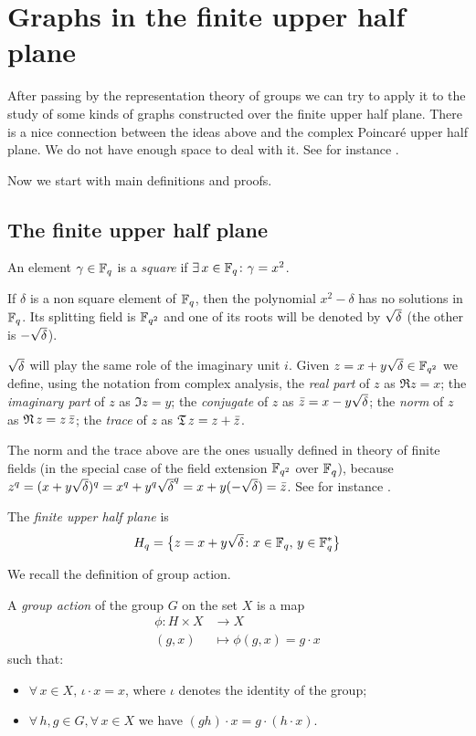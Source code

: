 \section{Graphs in the finite upper half plane}
After passing by the representation theory of groups we can try to apply it to the study of some kinds of graphs constructed
over the finite upper half plane. There is a nice connection between the ideas above and the complex Poincaré upper half plane. We
do not have enough space to deal with it. See for instance \cite{terras_1999}.

Now we start with main definitions and proofs.
\subsection{The finite upper half plane}
\begin{defn}
	An element $\gamma \in {\mathbb F}_q$ is a {\it square} if $\exists \, x \in {\mathbb F}_q \colon \gamma = x^2$.
\end{defn}
If $\delta$ is a non square element of ${\mathbb F}_q$, then the polynomial $x^2 - \delta$ has no solutions in ${\mathbb F}_q$.
Its splitting field is ${\mathbb F}_{q^2}$ and one of its roots will be denoted by $\sqrt{\delta}$ (the other is $-\sqrt{\delta}$). 

$\sqrt{\delta}$ will play the same role of the imaginary unit $i$. Given $z=x+y\sqrt{\delta} \in {\mathbb F}_{q^2}$ we define,
using the notation from complex analysis, the {\it real part} of $z$ as $\Re z = x$;
the {\it imaginary part} of $z$ as $\Im z = y$;
the {\it conjugate} of $z$ as $\bar{z} = x-y\sqrt{\delta}$; the {\it norm} of $z$ as $\operatorname{\mathfrak{N}} z = z \, \bar{z}$;
the {\it trace} of $z$ as $\operatorname{\mathfrak{T}} z = z+\bar{z}$.
\begin{rem}
The norm and the trace above are the ones usually defined in theory of finite fields (in the special case of the field 
extension ${\mathbb F}_{q^2}$ over ${\mathbb F}_q$), because $z^q= (x+y\sqrt{\delta})^q = x^q+y^q \sqrt{\delta}^q = x+y(-\sqrt{\delta}) =\bar{z}$.
See for instance \cite{lidl1994introduction}.
\end{rem}
\begin{defn}
	The {\it finite upper half plane} is
	\begin{equation}
		H_q = \big\{ z=x+y \sqrt{\delta} \colon x \in {\mathbb F}_q,\, y \in {\mathbb F}_q^* \big\} 
	\end{equation} 
\end{defn}

We recall the definition of group action.
\begin{defn}
  A {\it group action} of the group $G$ on the set $X$ is a map
  \begin{align*}
	\phi \colon H \times X & \longrightarrow X \\ (g,x) &\longmapsto \phi (g,x) = g \cdot x
\end{align*}
such that:
\begin{itemize}
\item $\forall \, x \in X,\, \iota \cdot x = x$, where $\iota$ denotes the identity of the group;
\item $\forall \, h,g \in G, \forall\, x \in X$ we have $(gh)\cdot x=g \cdot (h\cdot x)$.
\end{itemize} 
\end{defn}


